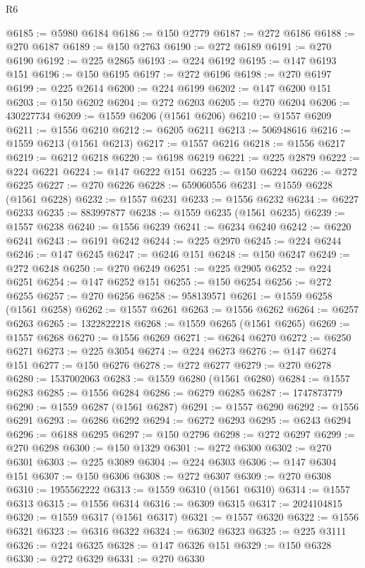 \begin{lexlean}{R6}
\begin{coremodule}
@6185 := @5980 @6184
@6186 := @150 @2779
@6187 := @272 @6186
@6188 := @270 @6187
@6189 := @150 @2763
@6190 := @272 @6189
@6191 := @270 @6190
@6192 := @225 @2865
@6193 := @224 @6192
@6195 := @147 @6193 @151
@6196 := @150 @6195
@6197 := @272 @6196
@6198 := @270 @6197
@6199 := @225 @2614
@6200 := @224 @6199
@6202 := @147 @6200 @151
@6203 := @150 @6202
@6204 := @272 @6203
@6205 := @270 @6204
@6206 := 430227734
@6209 := @1559 @6206 (@1561 @6206)
@6210 := @1557 @6209
@6211 := @1556 @6210
@6212 := @6205 @6211
@6213 := 506948616
@6216 := @1559 @6213 (@1561 @6213)
@6217 := @1557 @6216
@6218 := @1556 @6217
@6219 := @6212 @6218
@6220 := @6198 @6219
@6221 := @225 @2879
@6222 := @224 @6221
@6224 := @147 @6222 @151
@6225 := @150 @6224
@6226 := @272 @6225
@6227 := @270 @6226
@6228 := 659060556
@6231 := @1559 @6228 (@1561 @6228)
@6232 := @1557 @6231
@6233 := @1556 @6232
@6234 := @6227 @6233
@6235 := 883997877
@6238 := @1559 @6235 (@1561 @6235)
@6239 := @1557 @6238
@6240 := @1556 @6239
@6241 := @6234 @6240
@6242 := @6220 @6241
@6243 := @6191 @6242
@6244 := @225 @2970
@6245 := @224 @6244
@6246 := @147 @6245
@6247 := @6246 @151
@6248 := @150 @6247
@6249 := @272 @6248
@6250 := @270 @6249
@6251 := @225 @2905
@6252 := @224 @6251
@6254 := @147 @6252 @151
@6255 := @150 @6254
@6256 := @272 @6255
@6257 := @270 @6256
@6258 := 958139571
@6261 := @1559 @6258 (@1561 @6258)
@6262 := @1557 @6261
@6263 := @1556 @6262
@6264 := @6257 @6263
@6265 := 1322822218
@6268 := @1559 @6265 (@1561 @6265)
@6269 := @1557 @6268
@6270 := @1556 @6269
@6271 := @6264 @6270
@6272 := @6250 @6271
@6273 := @225 @3054
@6274 := @224 @6273
@6276 := @147 @6274 @151
@6277 := @150 @6276
@6278 := @272 @6277
@6279 := @270 @6278
@6280 := 1537002063
@6283 := @1559 @6280 (@1561 @6280)
@6284 := @1557 @6283
@6285 := @1556 @6284
@6286 := @6279 @6285
@6287 := 1747873779
@6290 := @1559 @6287 (@1561 @6287)
@6291 := @1557 @6290
@6292 := @1556 @6291
@6293 := @6286 @6292
@6294 := @6272 @6293
@6295 := @6243 @6294
@6296 := @6188 @6295
@6297 := @150 @2796
@6298 := @272 @6297
@6299 := @270 @6298
@6300 := @150 @1329
@6301 := @272 @6300
@6302 := @270 @6301
@6303 := @225 @3089
@6304 := @224 @6303
@6306 := @147 @6304 @151
@6307 := @150 @6306
@6308 := @272 @6307
@6309 := @270 @6308
@6310 := 1955562222
@6313 := @1559 @6310 (@1561 @6310)
@6314 := @1557 @6313
@6315 := @1556 @6314
@6316 := @6309 @6315
@6317 := 2024104815
@6320 := @1559 @6317 (@1561 @6317)
@6321 := @1557 @6320
@6322 := @1556 @6321
@6323 := @6316 @6322
@6324 := @6302 @6323
@6325 := @225 @3111
@6326 := @224 @6325
@6328 := @147 @6326 @151
@6329 := @150 @6328
@6330 := @272 @6329
@6331 := @270 @6330

\end{coremodule}
\end{lexlean}
